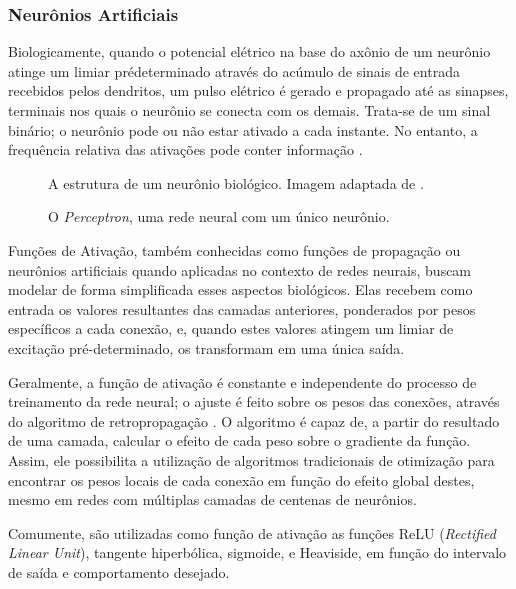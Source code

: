 \subsubsection{Neurônios Artificiais}

Biologicamente, quando o potencial elétrico na base do axônio de um neurônio atinge um limiar pré\-determinado através do acúmulo de sinais de entrada recebidos pelos dendritos, um pulso elétrico é gerado e propagado até as sinapses, terminais nos quais o neurônio se conecta com os demais.
Trata-se de um sinal binário; o neurônio pode ou não estar ativado a cada instante. No entanto, a frequência relativa das ativações pode conter informação \cite{behnkeHierarchicalNeuralNetworks2003}.

\begin{figure}[ht]
    \centering
    
    \caption{A estrutura de um neurônio biológico. Imagem adaptada de \cite{dhp1080IdoSkemoPri2016}.}
    \label{fig:bio_neuron}
\end{figure}

\begin{figure}[ht]
    \centering
    
    \caption{O \textit{Perceptron}, uma rede neural com um único neurônio.}
    \label{fig:perceptron}
\end{figure}

Funções de Ativação, também conhecidas como funções de propagação ou neurônios artificiais quando aplicadas no contexto de redes neurais, buscam modelar de forma simplificada esses aspectos biológicos.
Elas recebem como entrada os valores resultantes das camadas anteriores, ponderados por pesos específicos a cada conexão, e, quando estes valores atingem um limiar de excitação pré-determinado, os transformam em uma única saída.

Geralmente, a função de ativação é constante e independente do processo de treinamento da rede neural; o ajuste é feito sobre os pesos das conexões, através do algoritmo de retropropagação \cite{dreyfusArtificialNeuralNetworks1990}.
O algoritmo é capaz de, a partir do resultado de uma camada, calcular o efeito de cada peso sobre o gradiente da função.
Assim, ele possibilita a utilização de algoritmos tradicionais de otimização para encontrar os pesos locais de cada conexão em função do efeito global destes, mesmo em redes com múltiplas camadas de centenas de neurônios.

Comumente, são utilizadas como função de ativação as funções ReLU (\textit{Rectified Linear Unit}), tangente hiperbólica, sigmoide, e Heaviside, em função do intervalo de saída e comportamento desejado.

